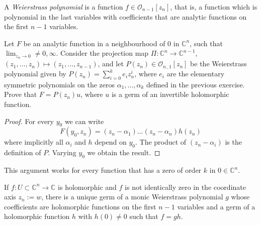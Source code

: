 \begin{definition}
\label{definition-Weierstrass-polynomial}
A {\it Weierstrass polynomial} is a function $f \in \mathcal{O}_{n-1}[z_n]$,
that is, a function which is polynomial in the last variables with coefficients
that are analytic functions on the first $n-1$ variables.
\end{definition}

\begin{exercise}
\label{exercise-Weierstrass-preparation-theorem}
Let $F$ be an analytic function in a neighbourhood of $0$ in $\mathbb{C}^n$,
such that $\lim_{z_n\to 0}\neq 0,\infty$. Consider the projection map
$\Pi:\mathbb{C}^n\to\mathbb{C}^{n-1}$, 
$(z_1,\ldots,z_n)\mapsto(z_1,\ldots,z_{n-1})$, and let 
$P(z_n)\in \mathcal{O}_{n_-1}[z_n]$ be the Weierstrass polynomial given by 
$P(z_n)=\sum_{i=0}^ke_iz_n^i$, where $e_i$ are the elementary symmetric
polynomials on the zeros $\alpha_1,\ldots,\alpha_k$ defined in the previous
exercise. Prove that $F=P(z_n)u$, where $u$ is a germ of an invertible
holomorphic function.
\end{exercise}

\begin{proof}
For every $y_0$ we can write
$$
F(y_0,z_n)=(z_n-\alpha_1)\ldots(z_n-\alpha_n)h(z_n)
$$
where implicitly all $\alpha_i$ and $h$ depend on $y_0$. The product of 
$(z_n-\alpha_i)$ is the definition of $P$. Varying $y_0$ we obtain the result.
\end{proof}

This argument works for every function that has a zero of order $k$ in
$0\in\mathbb{C}^n$.

\begin{theorem}
\label{theorem-Weierstrass-preparation}
If $f:U\subset\mathbb{C}^n\to\mathbb{C}$ is holomorphic and $f$ is not
identically zero in the coordinate axis $z_n:=w$, there
is a unique germ of a monic Weierstrass polynomial $g$ whose coefficients are
holomorphic functions on the first $n-1$ variables 
and a germ of a holomorphic 
function $h$ with $h(0)\neq 0$ such that $f=gh$.
\end{theorem}

